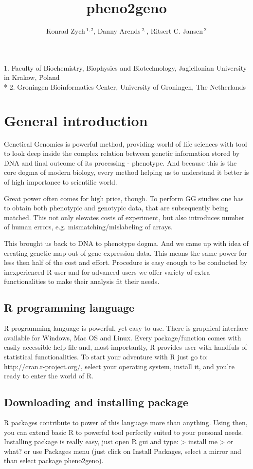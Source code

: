 \documentclass{article}
\begin{document}
\title {pheno2geno}
\author{
Konrad Zych\,$^{1,2}$, 
Danny Arends\,$^{2,}$,
 Ritsert C. Jansen\,$^{2}$
}
\maketitle
{\noindent}1. Faculty of Biochemistry, Biophysics and Biotechnology, Jagiellonian University in Krakow, Poland \\*
2. Groningen Bioinformatics Center, University of Groningen, The Netherlands

\newpage
\section{General introduction}

{\noindent}Genetical Genomics \citep{Jansen:2001388} is powerful method, providing world of life sciences with tool to look deep inside the complex relation between genetic information stored by DNA and final outcome of its processing - phenotype. And because this is the core dogma of modern biology, every method helping us to understand it better is of high importance to scientific world. 

{\noindent}Great power often comes for high price, though. To perform GG studies one has to obtain both phenotypic and genotypic data, that are subsequently being matched. This not only elevates costs of experiment, but also introduces number of human errors, e.g. mismatching/mislabeling of arrays.

{\noindent}This brought us back to DNA to phenotype dogma. And we came up with idea of creating genetic map out of gene expression data. This means the same power for less then half of the cost and effort. Procedure is easy enough to be conducted by inexperienced R user and for advanced users we offer variety of extra functionalities to make their analysis fit their needs.
\subsection{R programming language}
R programming language is powerful, yet easy-to-use. There is graphical interface available for Windows, Mac OS and Linux. Every package/function comes with easily accessible help file and, most importantly, R provides user with handfuls of statistical functionalities. To start your adventure with R just go to: http://cran.r-project.org/, select your operating system, install it, and you're ready to enter the world of R.
\subsection{Downloading and installing package}
R packages contribute to power of this language more than anything. Using then, you can extend basic R to powerful tool perfectly suited to your personal needs. Installing package is really easy, just open R gui and type:
> install me
> or what?
or use Packages menu (just click on Install Packages, select a mirror and than select package pheno2geno).
\end{document}
